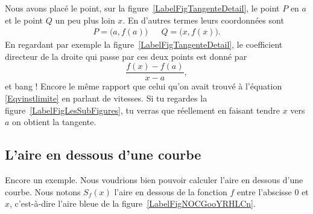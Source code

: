 \newcommand{\CaptionFigTangenteDetail}{Traçons d'abord une corde entre le point $P$ et un point $Q$ un peu plus loin.}


Nous avons placé le point, sur la figure~\ref{LabelFigTangenteDetail}, le point $P$ en $a$ et le point $Q$ un peu plus loin $x$. En d'autres termes leurs coordonnées sont
\begin{align}
	P=\big(a,f(a)\big)&& Q=\big(x,f(x)\big).
\end{align}
En regardant par exemple la figure~\ref{LabelFigTangenteDetail}, le coefficient directeur de la droite qui passe par ces deux points est donné par
\begin{equation}
	\frac{ f(x)-f(a) }{ x-a },
\end{equation}
et bang ! Encore le même rapport que celui qu'on avait trouvé à l'équation \eqref{Eqvinstlimite} en parlant de vitesses. Si tu regardes la figure~\ref{LabelFigLesSubFigures}, tu verras que réellement en faisant tendre $x$ vers $a$ on obtient la tangente.

\newcommand{\CaptionFigLesSubFigures}{Recherche de la tangente par approximations successives.}


\subsection{L'aire en dessous d'une courbe}		\label{SubSecAirePrimInto}

Encore un exemple. Nous voudrions bien pouvoir calculer l'aire en dessous d'une courbe. Nous notons $S_f(x)$ l'aire en dessous de la fonction $f$ entre l'abscisse $0$ et $x$, c'est-à-dire l'aire bleue de la figure~\ref{LabelFigNOCGooYRHLCn}. %
\newcommand{\CaptionFigNOCGooYRHLCn}{L'aire en dessous d'une courbe. Le rectangle rouge d'aire $f(x)\Delta x$ approxime l'augmentation de l'aire lorsqu'on passe de $x$ à $x+\Delta x$.}


